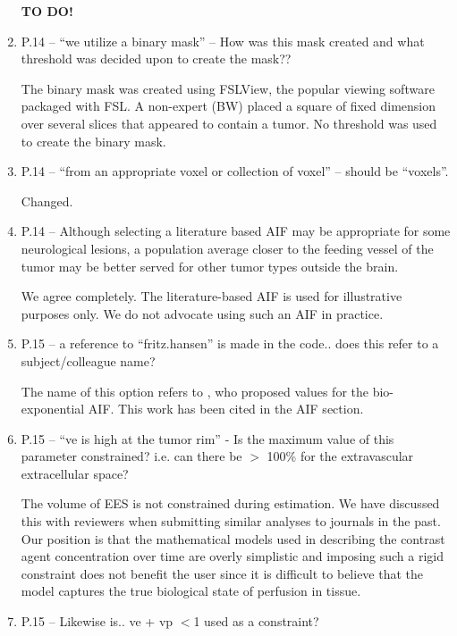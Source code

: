 \documentclass[11pt]{article}
\begin{document}
\begin{enumerate}
  \textbf{TO DO!}  

\item P.14 – ``we utilize a binary mask'' – How was this mask created
  and what threshold was decided upon to create the mask??

  The binary mask was created using FSLView, the popular viewing
  software packaged with FSL.  A non-expert (BW) placed a square of
  fixed dimension over several slices that appeared to contain a
  tumor.  No threshold was used to create the binary mask.

\item P.14 – ``from an appropriate voxel or collection of voxel'' –
  should be ``voxels''.

  Changed.

\item P.14 – Although selecting a literature based AIF may be
  appropriate for some neurological lesions, a population average
  closer to the feeding vessel of the tumor may be better served for
  other tumor types outside the brain.

  We agree completely.  The literature-based AIF is used for
  illustrative purposes only.  We do not advocate using such an AIF in
  practice.

\item P.15 – a reference to ``fritz.hansen'' is made in the
  code.. does this refer to a subject/colleague name?

  The name of this option refers to \citet{fri-etal:measurement}, who
  proposed values for the bio-exponential AIF.  This work has been
  cited in the AIF section.

\item P.15 – ``ve is high at the tumor rim'' - Is the maximum value of
  this parameter constrained? i.e. can there be $>$ 100\% for the
  extravascular extracellular space?

  The volume of EES is not constrained during estimation.  We have
  discussed this with reviewers when submitting similar analyses to
  journals in the past.  Our position is that the mathematical models
  used in describing the contrast agent concentration over time are
  overly simplistic and imposing such a rigid constraint does not
  benefit the user since it is difficult to believe that the model
  captures the true biological state of perfusion in tissue.

\item P.15 – Likewise is.. ve + vp $<$1 used as a constraint?


\end{enumerate}
\end{document}
